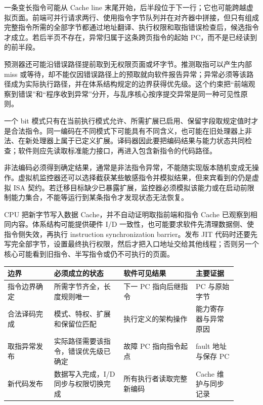 
一条变长指令可能从 Cache line 末尾开始，后半段位于下一行；它也可能跨越虚拟页面。前端可并行请求两行、使用指令字节队列并在对齐器中拼接，但只有组成完整指令所需的全部字节都通过地址翻译、执行权限和取指错误检查后，候选指令才成立。若后半页不存在，异常归属于这条跨页指令的起始 PC，而不是已经读到的前半段。

预测器还可能沿错误路径提前取到无权限页面或坏字节。推测取指可以产生内部 miss 或等待，却不能仅因错误路径上的预取就向软件报告异常；异常必须等该路径成为实际执行路径，并在体系结构规定的边界获得优先级。这个约束把“前端观察到错误”和“程序收到异常”分开，与乱序核心按序提交异常是同一种可见性原则。


一个 bit 模式只有在当前执行模式允许、所需扩展已启用、保留字段取规定值时才是合法指令。同一编码在不同模式下可能具有不同含义，也可能在旧处理器上非法、在新处理器上属于已定义扩展。译码器因此要把编码结果与能力状态共同检查；软件则应先读取标准能力接口，再进入包含新指令的代码路径。

非法编码必须得到确定结果，通常是非法指令异常，不能随实现版本随机变成无操作。虚拟机监控器还可以选择截获某些敏感指令并模拟结果，但来宾看到的仍是虚拟 ISA 契约。若迁移目标缺少已暴露扩展，监控器必须模拟该能力或在启动前限制能力集合，不能等运行到某条指令才发现状态无法恢复。


CPU 把新字节写入数据 Cache，并不自动证明取指前端和指令 Cache 已观察到相同内容。体系结构可能提供硬件 I/D 一致性，也可能要求软件先清理数据侧、使指令侧失效，再执行 instruction synchronization barrier。发布 JIT 代码时还要先写完全部字节，设置最终执行权限，然后才把入口地址交给其他线程；否则另一个核心可能看到旧指令、半写指令或仍不可执行的页面。

\begin{longtable}{L{0.18\linewidth}L{0.27\linewidth}L{0.29\linewidth}L{0.16\linewidth}}
\toprule
边界 & 必须成立的状态 & 软件可见结果 & 主要证据 \\
\midrule
指令边界确定 & 所需字节齐全，长度规则唯一 & 下一 PC 指向后继指令 & PC 与原始字节 \\\tablerowrule
合法译码完成 & 模式、特权、扩展和保留位匹配 & 执行定义的架构操作 & 能力寄存器与异常原因 \\\tablerowrule
取指异常发布 & 实际路径需要该指令，错误优先级已确定 & 故障 PC 指向指令起点 & fault 地址与保存 PC \\\tablerowrule
新代码发布 & 数据写入完成，I/D 同步与权限切换完成 & 所有执行者读取完整新编码 & Cache 维护与同步记录 \\
\bottomrule
\end{longtable}

